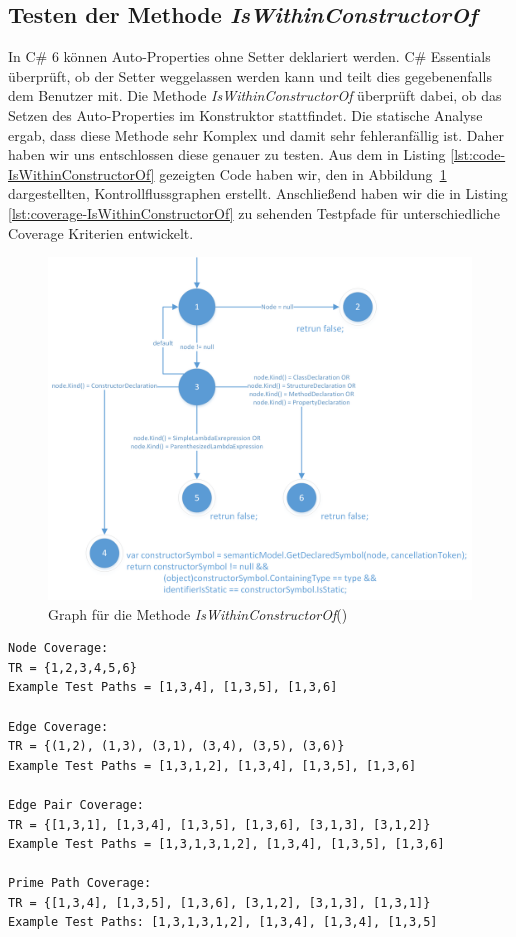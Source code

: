 \subsection{Testen der Methode \textit{IsWithinConstructorOf}}
In C\# 6 können Auto-Properties ohne Setter deklariert werden.\cite{csharp6} C\# Essentials überprüft, ob der Setter weggelassen werden kann und teilt dies gegebenenfalls dem Benutzer mit. Die Methode \textit{IsWithinConstructorOf} überprüft dabei, ob das Setzen des Auto-Properties im Konstruktor stattfindet. Die statische Analyse ergab, dass diese Methode sehr Komplex und damit sehr fehleranfällig ist. Daher haben wir uns entschlossen diese genauer zu testen. Aus dem in Listing \ref{lst:code-IsWithinConstructorOf} gezeigten Code haben wir, den in Abbildung~\ref{fig:graph-constructor} dargestellten, Kontrollflussgraphen erstellt. Anschließend haben wir die in Listing \ref{lst:coverage-IsWithinConstructorOf} zu sehenden Testpfade für unterschiedliche Coverage Kriterien entwickelt.\\
\begin{figure}[h]
	\centering
	\includegraphics[width=\textwidth]{images/GraphIsWithinConstructorOf.png}
	\caption{Graph für die Methode \textit{IsWithinConstructorOf}()}
	\label{fig:graph-constructor}
\end{figure}
\begin{lstlisting}[caption={Coverage für die Mehtode \textit{IsWithinConstructorOf}},
label=lst:coverage-IsWithinConstructorOf]
Node Coverage:
TR = {1,2,3,4,5,6}
Example Test Paths = [1,3,4], [1,3,5], [1,3,6]

Edge Coverage:
TR = {(1,2), (1,3), (3,1), (3,4), (3,5), (3,6)}
Example Test Paths = [1,3,1,2], [1,3,4], [1,3,5], [1,3,6]

Edge Pair Coverage:
TR = {[1,3,1], [1,3,4], [1,3,5], [1,3,6], [3,1,3], [3,1,2]}
Example Test Paths = [1,3,1,3,1,2], [1,3,4], [1,3,5], [1,3,6]

Prime Path Coverage:
TR = {[1,3,4], [1,3,5], [1,3,6], [3,1,2], [3,1,3], [1,3,1]}
Example Test Paths: [1,3,1,3,1,2], [1,3,4], [1,3,4], [1,3,5]
\end{lstlisting}
